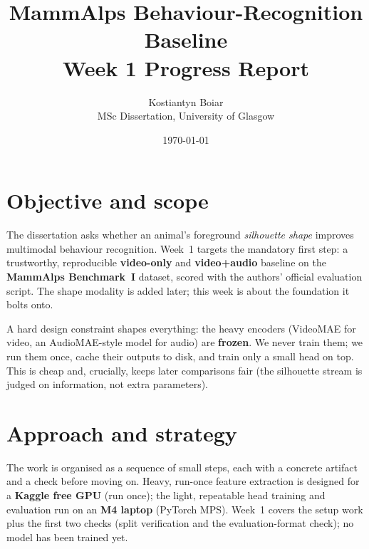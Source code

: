 \documentclass[11pt,a4paper]{article}
\title{\textbf{MammAlps Behaviour-Recognition Baseline}\\[2pt]
\large Week 1 Progress Report}
\author{Kostiantyn Boiar \\ \small MSc Dissertation, University of Glasgow}
\date{\today}
\begin{document}
\maketitle

\section{Objective and scope}
The dissertation asks whether an animal's foreground \emph{silhouette shape} improves
multimodal behaviour recognition. Week~1 targets the mandatory first step: a trustworthy,
reproducible \textbf{video-only} and \textbf{video+audio} baseline on the
\textbf{MammAlps Benchmark~I} dataset, scored with the authors' official evaluation script.
The shape modality is added later; this week is about the foundation it bolts onto.

A hard design constraint shapes everything: the heavy encoders (VideoMAE for video, an
AudioMAE-style model for audio) are \textbf{frozen}. We never train them; we run them once,
cache their outputs to disk, and train only a small head on top. This is cheap and, crucially,
keeps later comparisons fair (the silhouette stream is judged on information, not extra
parameters).

\section{Approach and strategy}
The work is organised as a sequence of small steps, each with a concrete artifact and a check
before moving on. Heavy, run-once feature extraction is designed for a \textbf{Kaggle free
GPU} (run once); the light, repeatable head training and evaluation run on an \textbf{M4
laptop} (PyTorch MPS). Week~1 covers the setup work plus the first two checks (split
verification and the evaluation-format check); no model has been trained yet.
\end{document}
